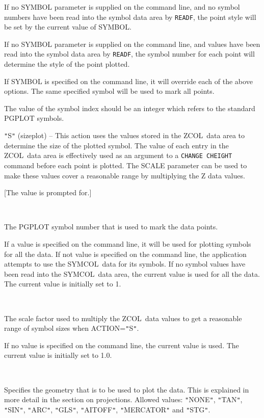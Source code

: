 \documentclass[twoside,11pt]{article}
\newcommand{\htmlref}[2]{#1}
\renewcommand{\_}{\texttt{\symbol{95}}}
\newcommand{\zcol}{{\sf ZCOL}}
\newcommand{\symcol}{{\sf SYMCOL}}
\newcommand{\cnam}[1]{{\tt #1}}
\newcommand{\iref} [1]{\htmlref{#1}{#1}}
\newcommand{\sstsubsection}[1]{ \item[{#1}] \mbox{} \\}
\newcommand{\sstitem}{\item}
\newcommand{\sstsubsection}[1]{\item[{#1}]}
\newcommand{\sstitem}{\item}
\begin{document}
\begin{sloppypar}
{{{{{               \sstitem
            If no SYMBOL parameter is supplied on the command line,
            and no symbol numbers have been read into the symbol data
            area by \cnam{\iref{READF}}, the point style will be set by the current
            value of SYMBOL.

               \sstitem
            If no SYMBOL parameter is supplied on the command line,
            and values have been read into the symbol data area by
            \cnam{READF}, the symbol number for each point will determine
            the style of the point plotted.

               \sstitem
            If SYMBOL is specified on the command line, it will
            override each of the above options. The same specified
            symbol will be used to mark all points.

            }
         The value of the symbol index should be an integer which
         refers to the standard PGPLOT symbols.

            \sstitem
            {\tt "}S{\tt "} (sizeplot) -- This action uses the values stored in the
            \zcol\ data area to determine the size of the plotted symbol.
            The value of each entry in the \zcol\ data area is effectively
            used as an argument to a \cnam{\iref{CHANGE} CHEIGHT} command before each
            point is plotted. The SCALE parameter can be used to make
            these values cover a reasonable range by multiplying the Z
            data values.

         }
         [The value is prompted for.]
      }
      \sstsubsection{
         SYMBOL = \_INTEGER (Read and Write)
      }{
         The PGPLOT symbol number that is used to mark the data points.

         If a value is specified on the command line, it will be used
         for plotting symbols for all the data. If not value is
         specified on the command line, the application attempts to use
         the \symcol\ data for its symbols. If no symbol values have been
         read into the \symcol\ data area, the current value is used for
         all the data. The current value is initially set to 1.
      }
      \sstsubsection{
         SCALE = \_REAL (Read and Write)
      }{
         The scale factor used to multiply the \zcol\ data values to get
         a reasonable range of symbol sizes when ACTION={\tt "}S{\tt "}.

         If no value is specified on the command line, the current
         value is used. The current value is initially set to 1.0.
      }
      \sstsubsection{
         PROJECTION = \_CHAR (Read)
      }{
         Specifies the geometry that is to be used to plot the data.
         This is explained in more detail in the section on
         projections.  Allowed values: {\tt "}NONE{\tt "}, {\tt "}TAN{\tt "}, {\tt "}SIN{\tt "}, {\tt "}ARC{\tt "},
         {\tt "}GLS{\tt "}, {\tt "}AITOFF{\tt "}, {\tt "}MERCATOR{\tt "} and {\tt "}STG{\tt "}.

}}}
\end{sloppypar}
\end{document}
